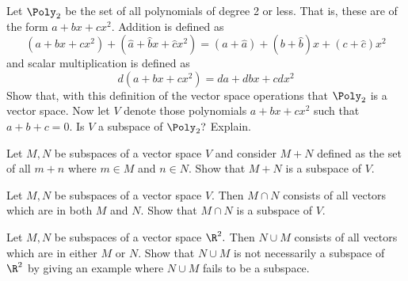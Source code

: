 \begin{enumialphparenastyle}
\begin{ex} Let $\Poly_{2}$ be the set of all polynomials of degree 2 or
less. That is, these are of the form $a+bx+cx^{2}$. Addition is defined as 
\begin{equation*}
\left( a+bx+cx^{2}\right) +\left( \hat{a}+\hat{b}x+\hat{c}x^{2}\right)
=\left( a+\hat{a}\right) +\left( b+\hat{b}\right) x+\left( c+\hat{c}\right)
x^{2}
\end{equation*}
and scalar multiplication is defined as 
\begin{equation*}
d\left( a+bx+cx^{2}\right) =da+dbx+cdx^{2}
\end{equation*}
Show that, with this definition of the vector space operations that $\Poly_{2}$ is a vector space. Now let $V$ denote those polynomials $a+bx+cx^{2}$
such that $a+b+c=0$. Is $V$ a subspace of $\Poly_{2}?$ Explain.
\end{ex}

\begin{ex} Let $M,N$ be subspaces of a vector space $V$ and consider $M+N$
defined as the set of all $m+n$ where $m\in M$ and $n\in N$. Show that $M+N$
is a subspace of $V$.
\end{ex}

\begin{ex} Let $M,N$ be subspaces of a vector space $V$. Then $M\cap N$ consists
of all vectors which are in both $M$ and $N$. Show that $M\cap N$ is a
subspace of $V$.
\end{ex}

\begin{ex} Let $M,N$ be subspaces of a vector space $\R^{2}.$ Then $N\cup
M$ consists of all vectors which are in either $M$ or $N$. Show that $N\cup
M $ is not necessarily a subspace of $\R^{2}$ by giving an example
where $N\cup M$ fails to be a subspace.
\end{ex}



\end{enumialphparenastyle}
